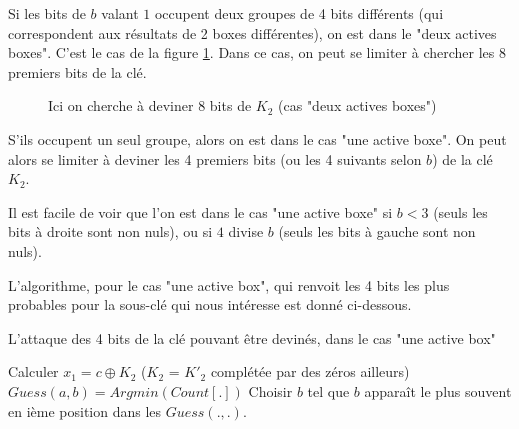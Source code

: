 Si les bits de $b$ valant $1$ occupent deux groupes de 4 bits différents (qui correspondent aux résultats de 2 boxes différentes), on est dans le "deux actives boxes". C'est le cas de la figure \ref{illustration_bits_key}. Dans ce cas, on peut se limiter à chercher les 8 premiers bits de la clé.


\begin{figure}[!h]
\centering
{}
\caption{Ici on cherche à deviner 8 bits de $K_2$ (cas "deux actives boxes")}
\label{illustration_bits_key}
\end{figure}


S'ils occupent un seul groupe, alors on est dans le cas "une active boxe". On peut alors se limiter à deviner les 4 premiers bits (ou les 4 suivants selon $b$) de la clé $K_2$.

Il est facile de voir que l'on est dans le cas "une active boxe" si $b < 3$ (seuls les bits à droite sont non nuls), ou si $4$ divise $b$ (seuls les bits à gauche sont non nuls). 

L'algorithme, pour le cas "une active box", qui renvoit les 4 bits les plus probables pour la sous-clé qui nous intéresse est donné ci-dessous.

\begin{algorithm}
\caption{L'attaque des 4 bits de la clé pouvant être devinés, dans le cas "une active box"}
	{
		{
			Calculer $x_1 = c \oplus K_2$ ($K_2$ = $K'_2$ complétée par des zéros ailleurs) \\
		}
		$Guess(a,b) = Argmin \left( Count[.] \right)$
	}
	{
		Choisir $b$ tel que $b$ apparaît le plus souvent en ième position dans les $Guess(.,.)$.
	}
\end{algorithm}

